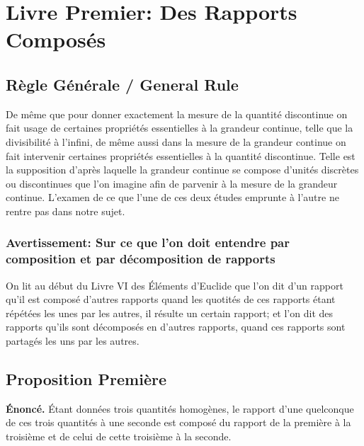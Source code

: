 \documentclass[11pt,a4paper]{article}
\theoremstyle{plain}
\theoremstyle{definition}
\theoremstyle{remark}
\begin{document}
\clearpage

\section{Livre Premier: Des Rapports Composés}
\label{sec:livre1}

\subsection*{Règle Générale / General Rule}


De même que pour donner exactement la mesure de la quantité discontinue on fait usage de certaines propriétés essentielles à la grandeur continue, telle que la divisibilité à l'infini, de même aussi dans la mesure de la grandeur continue on fait intervenir certaines propriétés essentielles à la quantité discontinue. Telle est la supposition d'après laquelle la grandeur continue se compose d'unités discrètes ou discontinues que l'on imagine afin de parvenir à la mesure de la grandeur continue. L'examen de ce que l'une de ces deux études emprunte à l'autre ne rentre pas dans notre sujet.


\subsubsection*{Avertissement: Sur ce que l'on doit entendre par composition et par décomposition de rapports}


On lit au début du Livre VI des Éléments d'Euclide que l'on dit d'un rapport qu'il est composé d'autres rapports quand les quotités de ces rapports étant répétées les unes par les autres, il résulte un certain rapport; et l'on dit des rapports qu'ils sont décomposés en d'autres rapports, quand ces rapports sont partagés les uns par les autres.


\subsection{Proposition Première}
\label{prop:1}


\textbf{Énoncé.} Étant données trois quantités homogènes, le rapport d'une quelconque de ces trois quantités à une seconde est composé du rapport de la première à la troisième et de celui de cette troisième à la seconde.
\end{document}
